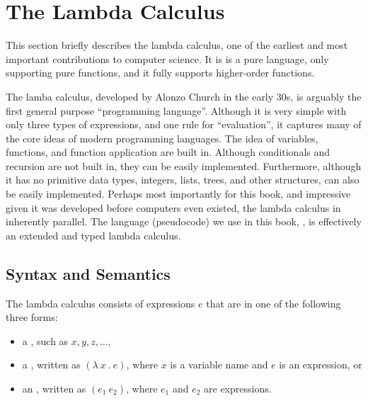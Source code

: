 \chapter{The Lambda Calculus}
\label{ch:lambda-calculus}

\begin{preamble}
This section briefly describes the lambda calculus, one of the
earliest and most important contributions to computer science.   It is
is a pure language, only supporting pure functions, and it fully
supports higher-order functions.
\end{preamble}

\begin{gram}
  The lamba calculus, developed by Alonzo Church in the early 30s, is arguably
  the first general purpose ``programming language''.  
%
  Although it is very simple with
  only three types of expressions, and one rule for ``evaluation'', it
  captures many of the core ideas of modern
  programming languages.  
%
  The idea of variables, functions, and
  function application are built in.  
%
  Although conditionals and
  recursion are not built in, they can be easily implemented.
%
  Furthermore, although it has no primitive data types, integers,
  lists, trees, and other structures, can also be easily implemented.    
%
  Perhaps most importantly for this book, and impressive given it was
  developed before computers even existed, the lambda calculus in
  inherently parallel.
%
  The language (pseudocode) we use in this book, \PML{}, is
  effectively an extended and typed lambda calculus.
\end{gram}

\section{Syntax and Semantics}
\label{sec:lc::syntax-and-semantics}

\begin{definition}
\label{def:lc::syntax}
The lambda calculus consists of expressions $e$ that are in one
of the following three forms:

\begin{itemize}
\item a , such as $x, y, z, \ldots$,

\item a , written as $(\lambda~x~.~e)$, where $x$ is a variable name and $e$ is
  an expression, or

\item an , written as $(e_1~e_2)$, where $e_1$ and
  $e_2$ are expressions.
\end{itemize}
\end{definition}

